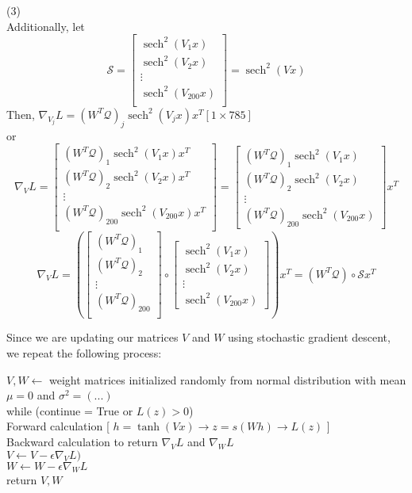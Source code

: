 \documentclass{report}
\DeclareMathOperator{\sech}{sech} %
\newcommand{\tab}{\-\hspace{0.5cm}}
\newcommand{\sep}{\-\hspace{0.3cm}}
\begin{document}
(3)\\
Additionally, let
$$ \mathcal{S} = \begin{bmatrix}
\sech^2(V_1 x) \\
\sech^2(V_2 x) \\
\vdots \\
\sech^2(V_{200} x)\\
\end{bmatrix} = \sech^2(Vx) $$
Then, $\nabla_{V_j} L = (W^T \mathcal{Q})_j \sech^2(V_jx)x^T $\tab\footnotesize$[1\times785]$\normalsize\\
\tab or
$$ \nabla_{V} L = \begin{bmatrix}
(W^T \mathcal{Q})_1 \sech^2(V_1 x)x^T \\
(W^T \mathcal{Q})_2 \sech^2(V_2 x)x^T \\
\vdots \\
(W^T \mathcal{Q})_{200} \sech^2(V_{200}x)x^T \\
\end{bmatrix} = \begin{bmatrix}
(W^T \mathcal{Q})_1 \sech^2(V_1 x) \\
(W^T \mathcal{Q})_2 \sech^2(V_2 x) \\
\vdots \\
(W^T \mathcal{Q})_{200} \sech^2(V_{200}x)
\end{bmatrix} x^T $$
$$\nabla_{V} L = \left(\begin{bmatrix}
(W^T \mathcal{Q})_1 \\
(W^T \mathcal{Q})_2 \\
\vdots \\
(W^T \mathcal{Q})_{200} \\
\end{bmatrix} \circ \begin{bmatrix}
\sech^2(V_1 x) \\
\sech^2(V_2 x) \\
\vdots \\
\sech^2(V_{200}x)
\end{bmatrix}\right) x^T = (W^T \mathcal{Q}) \circ \mathcal{S} x^T $$

\newpage
Since we are updating our matrices $V$ and $W$ using stochastic gradient descent, we repeat the following process:

\tab $V,W \leftarrow$ weight matrices initialized randomly from normal distribution with mean $\mu=0$ and $
\sigma^2 = (...)$\\
\tab while (continue = True or $L(z) > 0$) \\
\tab \tab \tab Forward calculation [ $h = \tanh(Vx)$\sep$\rightarrow$\sep$z = s(Wh)$\sep$\rightarrow$\sep$L(z)$ ]\\
\tab \tab \tab Backward calculation to return $\nabla_V L$ and $\nabla_W L$\\
\tab \tab \tab $V \leftarrow V - \epsilon \nabla_V L)$ \\
\tab \tab \tab $W \leftarrow W - \epsilon \nabla_W L$ \\
\tab return $V,W$ \\
\end{document}
